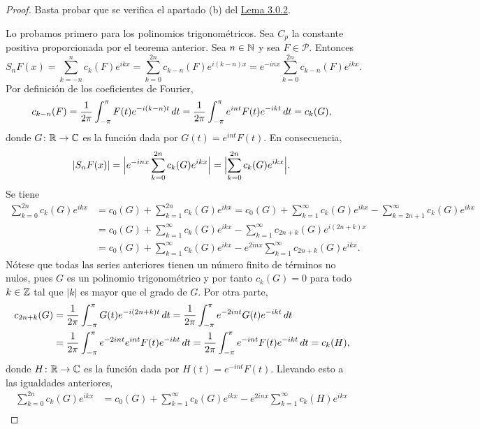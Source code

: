 \documentclass[a4paper, 12pt]{book}
\begin{document}
\begin{proof}
    Basta probar que se verifica el apartado (b) del \hyperref[3.0.2]{Lema 3.0.2}. 
    
    Lo probamos primero para los polinomios trigonométricos. Sea $C_p$ la constante positiva proporcionada por el teorema anterior. Sea $n \in \mathbb N$ y sea  $F \in \mathcal{P}$. Entonces
    \[S_nF(x) = \sum_{k=-n}^n c_k(F)e^{ikx} = \sum_{k=0}^{2n}c_{k-n}(F)e^{i(k-n)x} = e^{-inx}\sum_{k=0}^{2n}c_{k-n}(F)e^{ikx}.\]
    Por definición de los coeficientes de Fourier,
    \[c_{k-n}(F) = \frac{1}{2\pi}\int_{-\pi}^{\pi} F(t)e^{-i(k-n)t} \, dt = \frac{1}{2\pi}\int_{-\pi}^{\pi} e^{int}F(t)e^{-ikt} \, dt = c_k(G),\]
    donde $G \colon \mathbb R \to \mathbb C$ es la función dada por $G(t)=e^{int}F(t)$. En consecuencia,
    \begin{equation}\label{3.3.5}
    |S_nF(x)| = \Bigl|e^{-inx}\sum_{k=0}^{2n}c_k(G)e^{ikx}\Bigr|= \Bigl|\sum_{k=0}^{2n}c_k(G)e^{ikx}\Bigr|.
    \end{equation}
    Se tiene
    \begin{align*}
        \sum_{k=0}^{2n}c_k(G)e^{ikx} &= c_0(G)+ \sum_{k=1}^{2n} c_k(G)e^{ikx} = c_0(G)+\sum_{k=1}^{\infty} c_k(G)e^{ikx} - \sum_{k=2n+1}^{\infty} c_k(G)e^{ikx} \\
        &= c_0(G) + \sum_{k=1}^{\infty} c_k(G)e^{ikx} - \sum_{k=1}^{\infty} c_{2n+k}(G)e^{i(2n+k)x} \\
        &= c_0(G) + \sum_{k=1}^{\infty} c_k(G)e^{ikx} - e^{2inx}\sum_{k=1}^{\infty} c_{2n+k}(G)e^{ikx}.
    \end{align*}
    Nótese que todas las series anteriores tienen un número finito de términos no nulos, pues $G$ es un polinomio trigonométrico y por tanto $c_k(G) = 0$ para todo $k \in \mathbb Z$ tal que $|k|$ es mayor que el grado de $G$. Por otra parte,
    \begin{align*}
        c_{2n+k}(G) &= \frac{1}{2\pi}\int_{-\pi}^{\pi} G(t)e^{-i(2n+k)t} \, dt = \frac{1}{2\pi}\int_{-\pi}^{\pi} e^{-2int}G(t)e^{-ikt} \, dt \\
        &=  \frac{1}{2\pi}\int_{-\pi}^{\pi} e^{-2int}e^{int}F(t)e^{-ikt} \, dt = \frac{1}{2\pi}\int_{-\pi}^{\pi} e^{-int}F(t)e^{-ikt} \, dt = c_k(H),
    \end{align*}
    donde $H \colon \mathbb R \to \mathbb C$ es la función dada por $H(t) = e^{-int}F(t)$. Llevando esto a las igualdades anteriores,
    \begin{align*}
        \sum_{k=0}^{2n}c_k(G)e^{ikx} &= c_0(G) + \sum_{k=1}^{\infty} c_k(G)e^{ikx} - e^{2inx}\sum_{k=1}^{\infty} c_k(H)e^{ikx} \\

\end{align*}
\end{proof}
\end{document}

